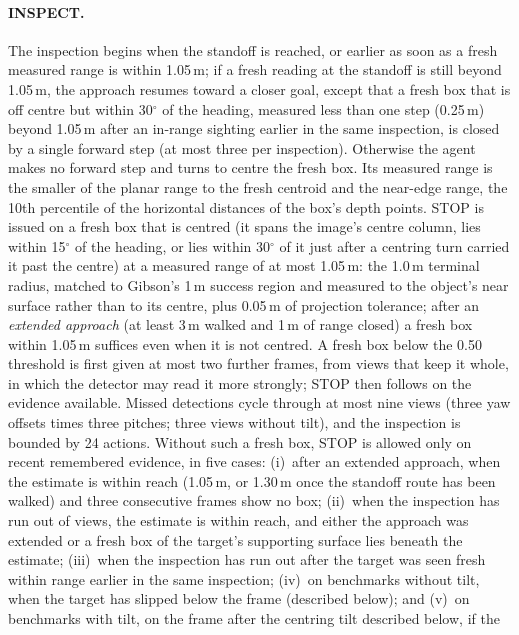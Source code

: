 \documentclass[10pt]{article}
\begin{document}
\paragraph{INSPECT.}
The inspection begins when the standoff is reached, or earlier as soon as a fresh measured range is within 1.05\,m; if
a fresh reading at the standoff is still beyond 1.05\,m, the approach resumes toward a closer goal, except that a fresh
box that is off centre but within 30$^\circ$ of the heading, measured less than one step (0.25\,m) beyond 1.05\,m after
an in-range sighting earlier in the same inspection, is closed by a single forward step (at most three per
inspection). Otherwise the agent makes no forward step and turns to centre the fresh box. Its measured range is the smaller of the planar range to the fresh
centroid and the near-edge range, the 10th percentile of the horizontal distances of the box's depth points. STOP is
issued on a fresh box that is centred (it spans the image's centre column, lies within 15$^\circ$ of the heading, or
lies within 30$^\circ$ of it just after a centring turn carried it past the centre) at
a measured range of at most 1.05\,m: the 1.0\,m terminal radius, matched to Gibson's 1\,m success region and measured
to the object's near surface rather than to its centre, plus 0.05\,m of projection tolerance; after an
\emph{extended approach} (at least 3\,m walked and 1\,m of range closed) a fresh box within 1.05\,m suffices even
when it is not centred. A fresh box below the 0.50 threshold is first given at most two further frames, from views
that keep it whole, in which the detector may read it more strongly; STOP then follows on the evidence available.
Missed detections cycle through at most nine views (three yaw offsets times three pitches; three views without tilt),
and the inspection is bounded by 24 actions. Without such a fresh box, STOP is allowed only on recent remembered
evidence, in five cases: (i)~after an extended approach, when the estimate is within reach (1.05\,m, or 1.30\,m once
the standoff route has been walked) and three consecutive frames show no box; (ii)~when the inspection has run out of
views, the estimate is within reach, and either the approach was extended or a fresh box of the target's supporting
surface lies beneath the estimate; (iii)~when the inspection has run out after the target was seen fresh within range
earlier in the same inspection; (iv)~on benchmarks without tilt, when the target has slipped below the frame
(described below); and (v)~on benchmarks with tilt, on the frame after the centring tilt described below, if the
\end{document}

